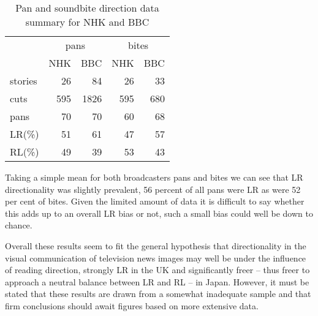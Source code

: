 \documentclass[11pt, oneside, a4paper]{scrartcl}
\let\footnote=\endnote
\begin{document}
\begin{table}[tb]
\begin{center}
\begin{tabular}{l rr | rr}
\toprule
 & \multicolumn{2}{c}{\sc pans} & \multicolumn{2}{c}{\sc bites} \\ 
 & NHK & BBC & NHK & BBC \\ 
\midrule
stories{ }{ } & 26 & 84 & 26 & 33 \\ 
cuts & 595 & 1826 & 595 & 680 \\ 
pans & 70 & 70 & 60 & 68 \\ 
\midrule
LR(\%) & 51 & 61 & 47 & 57 \\ 
RL(\%) & 49 & 39 & 53 & 43 \\ 
\bottomrule
\end{tabular}
\end{center}
\caption{Pan and soundbite direction data summary for NHK and BBC\label{tab:panbite}}
\end{table}

Taking a simple mean for both broadcasters pans and bites we can see that LR directionality was slightly prevalent, 56 percent  of all pans were LR as were 52 per cent of bites. Given the limited amount of data it is difficult to say whether this adds up to an overall LR bias or not, such a small bias could well be down to chance.  

Overall these results seem to fit the general hypothesis that directionality in the visual communication of television news images may well be under the influence of reading direction, strongly LR in the UK and significantly freer -- thus freer to approach a neutral balance between LR and RL -- in Japan. However, it must be stated that these results are drawn from a somewhat inadequate sample and that firm conclusions should await figures based on more extensive data.\footnote{see n.\,\ref{fn:copy-protect}}
\end{document}

